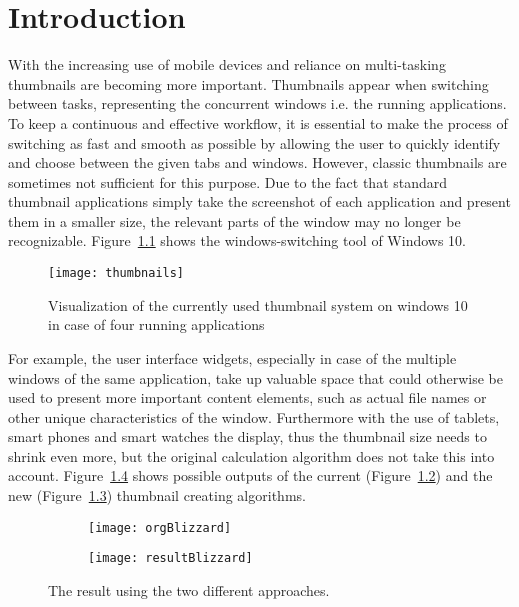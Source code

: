 \documentclass[draft,final]{vutinfth} %
\begin{document}
	\chapter{Introduction}
	With the increasing use of mobile devices and reliance on multi-tasking thumbnails are becoming more important.
	Thumbnails appear when switching between tasks, representing the concurrent windows i.e. the running applications.
	To keep a continuous and effective workflow, it is essential to make the process of switching as fast and smooth as possible by allowing the user to quickly identify and choose between the given tabs and windows. 
	However, classic thumbnails are sometimes not sufficient for this purpose. 
	Due to the fact that standard thumbnail applications simply take the screenshot of each application and present them in a smaller size, the relevant parts of the window may no longer be recognizable.
	Figure~\ref{fig:thumbnails} shows the windows-switching tool of Windows 10.
	\begin{figure}[H]
		\centering		
		\texttt{[image: thumbnails]}
		\caption{Visualization of the currently used thumbnail system on windows 10 in case of four running applications}
		\label{fig:thumbnails}
	\end{figure} 
	For example, the user interface widgets, especially in case of the multiple windows of the same application, take up valuable space that could otherwise be used to present more important content elements, such as actual file names or other unique characteristics of the window.
	Furthermore with the use of tablets, smart phones and smart watches the display, thus the thumbnail size needs to shrink even more, but the original calculation algorithm does not take this into account.
	Figure~\ref{fig:introo} shows possible outputs of the current (Figure~\ref{fig:introo:org}) and the new (Figure~\ref{fig:introo:res}) thumbnail creating algorithms.\par 
	\begin{figure}[h]
		\centering
		\begin{subfigure}[b]{0.45\columnwidth}
			\centering
			\texttt{[image: orgBlizzard]}
			\label{fig:introo:org}
		\end{subfigure}
		\begin{subfigure}[b]{0.45\columnwidth}
			\centering
			\texttt{[image: resultBlizzard]}
			\label{fig:introo:res}
		\end{subfigure}
		\caption{The result using the two different approaches.}
		\label{fig:introo} %
	\end{figure}
\end{document}
